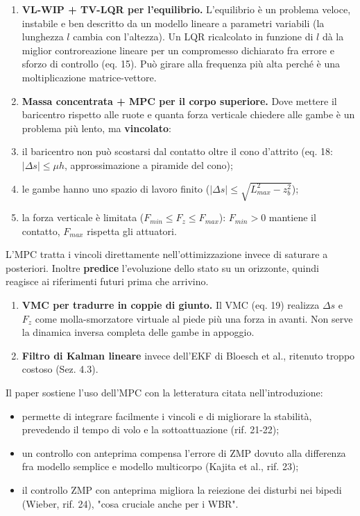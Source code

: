 \documentclass[
]{article}
\providecommand{\tightlist}{%
  \setlength{\itemsep}{0pt}\setlength{\parskip}{0pt}}
\begin{document}
\begin{enumerate}
\tightlist
\item \textbf{VL-WIP + TV-LQR per l'equilibrio.} L'equilibrio è un problema veloce, instabile e ben descritto da un modello lineare a parametri variabili (la lunghezza \(l\) cambia con l'altezza). Un LQR ricalcolato in funzione di \(l\) dà la miglior controreazione lineare per un compromesso dichiarato fra errore e sforzo di controllo (eq. 15). Può girare alla frequenza più alta perché è una moltiplicazione matrice-vettore.
\item \textbf{Massa concentrata + MPC per il corpo superiore.} Dove mettere il baricentro rispetto alle ruote e quanta forza verticale chiedere alle gambe è un problema più lento, ma \textbf{vincolato}:
\item il baricentro non può scostarsi dal contatto oltre il cono d'attrito (eq. 18: \(|\Delta s|\le\mu h\), approssimazione a piramide del cono);
\item le gambe hanno uno spazio di lavoro finito (\(|\Delta s|\le\sqrt{L_{max}^2-z_b^2}\));
\item la forza verticale è limitata (\(F_{min}\le F_z\le F_{max}\)): \(F_{min} > 0\) mantiene il contatto, \(F_{max}\) rispetta gli attuatori.
\end{enumerate}

L'MPC tratta i vincoli direttamente nell'ottimizzazione invece di saturare a posteriori. Inoltre \textbf{predice} l'evoluzione dello stato su un orizzonte, quindi reagisce ai riferimenti futuri prima che arrivino.

\begin{enumerate}
\tightlist
\item \textbf{VMC per tradurre in coppie di giunto.} Il VMC (eq. 19) realizza \(\Delta s\) e \(F_z\) come molla-smorzatore virtuale al piede più una forza in avanti. Non serve la dinamica inversa completa delle gambe in appoggio.
\item \textbf{Filtro di Kalman lineare} invece dell'EKF di Bloesch et al., ritenuto troppo costoso (Sez. 4.3).
\end{enumerate}

Il paper sostiene l'uso dell'MPC con la letteratura citata nell'introduzione:

\begin{itemize}
\tightlist
\item permette di integrare facilmente i vincoli e di migliorare la stabilità, prevedendo il tempo di volo e la sottoattuazione (rif. 21-22);
\item un controllo con anteprima compensa l'errore di ZMP dovuto alla differenza fra modello semplice e modello multicorpo (Kajita et al., rif. 23);
\item il controllo ZMP con anteprima migliora la reiezione dei disturbi nei bipedi (Wieber, rif. 24), "cosa cruciale anche per i WBR".
\end{itemize}
\end{document}
